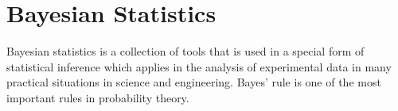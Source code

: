 \chapter{Bayesian Statistics}
Bayesian statistics is a collection of tools that is used in a special form of statistical
inference which applies in the analysis of experimental data in many practical
situations in science and engineering. Bayes’ rule is one of the most important
rules in probability theory.


